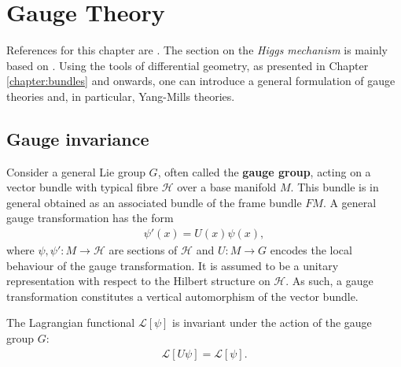 \chapter{Gauge Theory}\label{chapter:gauge_theory}

    References for this chapter are \cite{principal_bundles, sen_nash, schuller, gauge1}. The section on the \textit{Higgs mechanism} is mainly based on \cite{AMP2}. Using the tools of differential geometry, as presented in Chapter \ref{chapter:bundles} and onwards, one can introduce a general formulation of gauge theories and, in particular, Yang-Mills theories.

\section{Gauge invariance}

    Consider a general Lie group $G$, often called the \textbf{gauge group}, acting on a vector bundle with typical fibre $\mathcal{H}$ over a base manifold $M$. This bundle is in general obtained as an associated bundle of the frame bundle $FM$. A general gauge transformation has the form
    \begin{gather}
        \label{gauge:gauge_transformation}
        \psi'(x) = U(x)\psi(x),
    \end{gather}
    where $\psi,\psi':M\rightarrow\mathcal{H}$ are sections of $\mathcal{H}$ and $U:M\rightarrow G$ encodes the local behaviour of the gauge transformation. It is assumed to be a unitary representation with respect to the Hilbert structure on $\mathcal{H}$. As such, a gauge transformation constitutes a vertical automorphism of the vector bundle.

    \begin{axiom}
        The Lagrangian functional $\mathcal{L}[\psi]$ is invariant under the action of the gauge group $G$:
        \begin{gather}
            \mathcal{L}[U\psi] = \mathcal{L}[\psi].
        \end{gather}
    \end{axiom}

